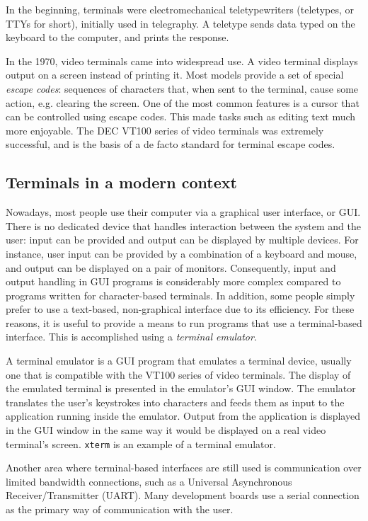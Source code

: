 \documentclass[shortabstract, manyadvisors, english, mgr]{iithesis}
\begin{document}
In the beginning, terminals were electromechanical teletypewriters
(teletypes, or TTYs for short), initially used in telegraphy. A teletype
sends data typed on the keyboard to the computer, and prints the response.

In the 1970, video terminals came into widespread use. A video terminal displays
output on a screen instead of printing it. Most models provide a set of special
\textit{escape codes}: sequences of characters that, when sent to the terminal,
cause some action, e.g. clearing the screen. One of the most common features is
a cursor that can be controlled using escape codes. This made tasks such as
editing text much more enjoyable. The DEC VT100 series of video terminals was
extremely successful, and is the basis of a de facto standard for terminal
escape codes.

\subsection{Terminals in a modern context}

Nowadays, most people use their computer via a graphical user interface, or GUI.
There is no dedicated device that handles interaction between the system and the
user: input can be provided and output can be displayed by multiple devices. For
instance, user input can be provided by a combination of a keyboard and mouse,
and output can be displayed on a pair of monitors. Consequently, input and
output handling in GUI programs is considerably more complex compared to
programs written for character-based terminals. In addition, some people simply
prefer to use a text-based, non-graphical interface due to its efficiency. For
these reasons, it is useful to provide a means to run programs that use a
terminal-based interface. This is accomplished using a \textit{terminal
emulator}.

A terminal emulator is a GUI program that emulates a terminal device, usually
one that is compatible with the VT100 series of video terminals. The display of
the emulated terminal is presented in the emulator's GUI window. The emulator
translates the user's keystrokes into characters and feeds them as input to the
application running inside the emulator. Output from the application is
displayed in the GUI window in the same way it would be displayed on a real
video terminal's screen. \texttt{xterm} is an example of a terminal emulator.

Another area where terminal-based interfaces are still used is communication
over limited bandwidth connections, such as a Universal Asynchronous
Receiver/Transmitter (UART). Many development boards use a serial connection
as the primary way of communication with the user.
\end{document}
